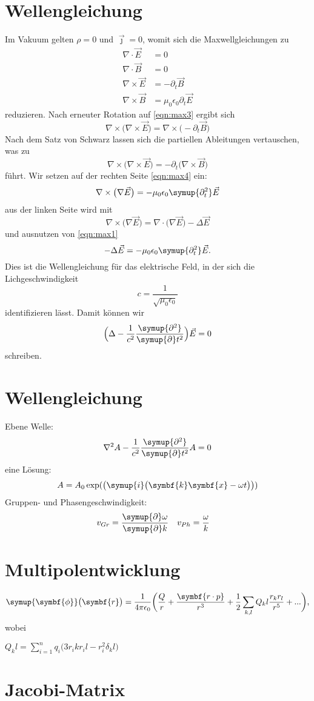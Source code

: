 \documentclass{scrartcl}
\newcommand{\be}{\begin{equation}} %
\newcommand{\ee}{\end{equation}} %
\begin{document}
\section{Wellengleichung}
Im Vakuum gelten $\rho=0$ und $\vec{\jmath}=0$, womit sich die Maxwellgleichungen
zu
\begin{align}
  \nabla\cdot\vec{E}&=0 \label{eqn:max1} \\
  \nabla\cdot\vec{B}&=0 \label{eqn:max2} \\
  \nabla\times\vec{E}&=-\partial_t\vec{B} \label{eqn:max3} \\
  \nabla\times\vec{B}&=\mu_0\epsilon_0\partial_t\vec{E} \label{eqn:max4}
\end{align}
reduzieren. Nach erneuter Rotation auf \eqref{eqn:max3} ergibt sich
\be
\nabla\times\bigl(\nabla\times\vec{E}\bigr)=\nabla\times\bigl(-\partial_t\vec{B}\bigr)
\label{eqn:rot}
\ee
Nach dem Satz von Schwarz lassen sich die partiellen Ableitungen vertauschen, was zu
\be
\nabla\times\bigl(\nabla\times\vec{E}\bigr)=-\partial_t\bigl(\nabla\times\vec{B}\bigr)
\label{eqn:schwarz}
\ee
führt. Wir setzen auf der rechten Seite \eqref{eqn:max4} ein:
\be
\nabla\times\bigl(\nabla\vec{E}\bigr)=-\mu_0\epsilon_0\symup{\partial_t^2}\vec{E}\label{eqn:ein}
\ee
aus der linken Seite wird mit
\be
\nabla\times\bigl(\nabla\vec{E}\bigr)=\nabla\cdot\bigl(\nabla\vec{E}\bigr)-\Delta
\vec{E} \label{eqn:2}
\ee
\newpage
und ausnutzen von \eqref{eqn:max1}
\be
-\Delta\vec{E}=-\mu_0\epsilon_0\symup{\partial_t^2}\vec{E}.
\label{eqn:13}
\ee
Dies ist die Wellengleichung für das elektrische Feld,
in der sich die Lichgeschwindigkeit
\be
c=\frac{1}{\sqrt{\mu_0\epsilon_0}}\label{eqn:14}
\ee
identifizieren lässt. Damit können wir
\be
\Bigl(\Delta-\frac{1}{c^2}\frac{\symup{\partial^2}}{\symup{\partial}t^2}\Bigr)
\vec{E}=0 \label{eqn:15}
\ee
schreiben.
\section{Wellengleichung}
Ebene Welle:
\be
\nabla^2 A -\frac{1}{c^2}\frac{\symup{\partial^2}}{\symup{\partial}t^2}A=0
\label{eqn:16}
\ee
eine Lösung:
\be
A=A_0\exp(\bigl(\symup{i}\bigl(\symbf{k} \symbf{x}-\omega t\bigr)\bigr)) \label{eqn:17}
\ee
Gruppen- und Phasengeschwindigkeit:
\begin{align}
  v_{Gr}&=\frac{\symup{\partial}\omega}{\symup{\partial}k} &
  v_{Ph}&=\frac{\omega}{k}
\end{align}
\section{Multipolentwicklung}
\be
\symup{\symbf{\phi}}\bigl(\symbf{r}\bigr)=\frac{1}{4\pi\epsilon_0}
\biggl(\frac{Q}{r}+\frac{\symbf{r\cdot p}}{r^3}+\frac{1}{2}
\sum_{k,l}Q_kl \frac{r_k r_l}{r^5}+...\biggr) \label{eqn:19},
\ee
wobei \\
\begin{center}
  $Q_kl=\sum_{i=1}^n q_i \bigl(3r_ik r_il -r^2_i \delta_kl \bigr)$
\end{center}
\section{Jacobi-Matrix}
\end{document}
